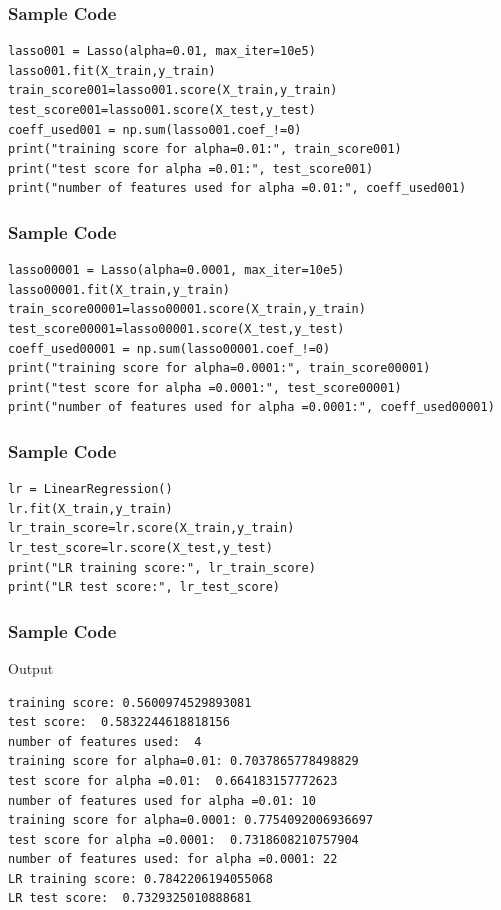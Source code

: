\begin{frame}[fragile]\frametitle{Sample Code}

\begin{lstlisting}
lasso001 = Lasso(alpha=0.01, max_iter=10e5)
lasso001.fit(X_train,y_train)
train_score001=lasso001.score(X_train,y_train)
test_score001=lasso001.score(X_test,y_test)
coeff_used001 = np.sum(lasso001.coef_!=0)
print("training score for alpha=0.01:", train_score001)
print("test score for alpha =0.01:", test_score001)
print("number of features used for alpha =0.01:", coeff_used001)
\end{lstlisting}

\end{frame}


\begin{frame}[fragile]\frametitle{Sample Code}

\begin{lstlisting}
lasso00001 = Lasso(alpha=0.0001, max_iter=10e5)
lasso00001.fit(X_train,y_train)
train_score00001=lasso00001.score(X_train,y_train)
test_score00001=lasso00001.score(X_test,y_test)
coeff_used00001 = np.sum(lasso00001.coef_!=0)
print("training score for alpha=0.0001:", train_score00001)
print("test score for alpha =0.0001:", test_score00001)
print("number of features used for alpha =0.0001:", coeff_used00001)
\end{lstlisting}

\end{frame}

\begin{frame}[fragile]\frametitle{Sample Code}

\begin{lstlisting}
lr = LinearRegression()
lr.fit(X_train,y_train)
lr_train_score=lr.score(X_train,y_train)
lr_test_score=lr.score(X_test,y_test)
print("LR training score:", lr_train_score)
print("LR test score:", lr_test_score)
\end{lstlisting}

\end{frame}


\begin{frame}[fragile]\frametitle{Sample Code}
Output

\begin{lstlisting}
training score: 0.5600974529893081
test score:  0.5832244618818156
number of features used:  4
training score for alpha=0.01: 0.7037865778498829
test score for alpha =0.01:  0.664183157772623
number of features used for alpha =0.01: 10
training score for alpha=0.0001: 0.7754092006936697
test score for alpha =0.0001:  0.7318608210757904
number of features used: for alpha =0.0001: 22
LR training score: 0.7842206194055068
LR test score:  0.7329325010888681
\end{lstlisting}

\end{frame}

